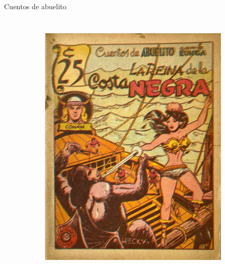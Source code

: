 \begin{frame}{Cuentos de abuelito}
\begin{columns}
\begin{figure}[htb]
\begin{subfigure}[b]{0.35\textwidth}
				\includegraphics[width=\textwidth]{img/abuelito03}
			\end{subfigure}
			~
			\begin{subfigure}[b]{0.35\textwidth}

\end{subfigure}
\end{figure}
\end{columns}
\end{frame}

